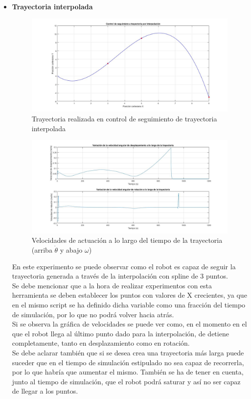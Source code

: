 \documentclass[a4paper,twoside]{article}
\begin{document}
\begin{itemize}
		\item \textbf{Trayectoria interpolada}
		\begin{figure}[H]
			\centering
			\includegraphics[width=1\textwidth]{control_tray_2}
			\caption{Trayectoria realizada en control de seguimiento de trayectoria interpolada}
		\end{figure}
		\begin{figure}[H]
			\centering
			\includegraphics[width=1\textwidth]{control_tray_2_2}
			\caption{Velocidades de actuación a lo largo del tiempo de la trayectoria (arriba $\dot{\theta}$ y abajo $\omega$)}
		\end{figure}
		En este experimento se puede observar como el robot es capaz de seguir la trayectoria generada a través de la interpolación con spline de 3 puntos.\\
		Se debe mencionar que a la hora de realizar experimentos con esta herramienta se deben establecer los puntos con valores de X crecientes, ya que en el mismo script se ha definido dicha variable como una fracción del tiempo de simulación, por lo que no podrá volver hacia atrás.\\
		Si se observa la gráfica de velocidades se puede ver como, en el momento en el que el robot llega al último punto dado para la interpolación, de detiene completamente, tanto en desplazamiento como en rotación.\\
		
		Se debe aclarar también que si se desea crea una trayectoria más larga puede suceder que en el tiempo de simulación estipulado no sea capaz de recorrerla, por lo que habría que aumentar el mismo. También se ha de tener en cuenta, junto al tiempo de simulación, que el robot podrá saturar y así no ser capaz de llegar a los puntos.
	\end{itemize}
	
\end{document}
